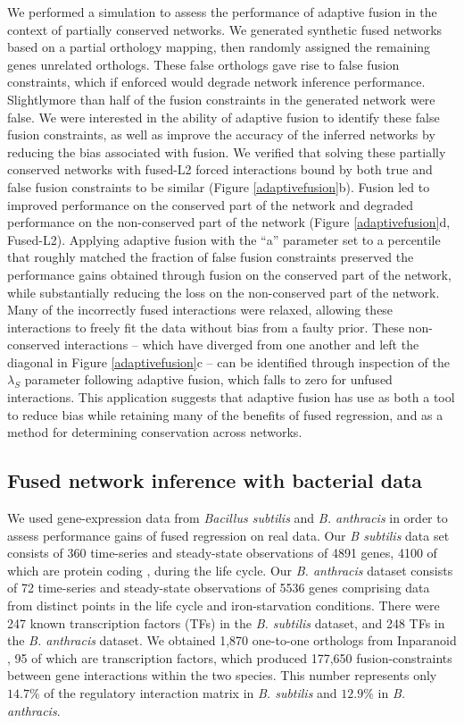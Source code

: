 \documentclass[11pt]{article}
\begin{document}
We performed a simulation to assess the performance of adaptive fusion in the context of partially conserved networks. We generated synthetic fused networks based on a partial orthology mapping, then randomly assigned the remaining genes unrelated orthologs. These false orthologs gave rise to false fusion constraints, which if enforced would degrade network inference performance. Slightlymore than half of the fusion constraints in the generated network were false. We were interested in the ability of adaptive fusion to identify these false fusion constraints, as well as improve the accuracy of the inferred networks by reducing the bias associated with fusion. We verified that solving these partially conserved networks with fused-L2 forced interactions bound by both true and false fusion constraints to be similar (Figure \ref{adaptivefusion}b). Fusion led to improved performance on the conserved part of the network and degraded performance on the non-conserved part of the network (Figure \ref{adaptivefusion}d, Fused-L2). Applying adaptive fusion with the ``a'' parameter set to a percentile that roughly matched the fraction of false fusion constraints preserved the performance gains obtained through fusion on the conserved part of the network, while substantially reducing the loss on the non-conserved part of the network. Many of the incorrectly fused interactions were relaxed, allowing these interactions to freely fit the data without bias from a faulty prior. These non-conserved interactions -- which have diverged from one another and left the diagonal in  Figure \ref{adaptivefusion}c -- can be identified through inspection of the $\lambda_S$ parameter following adaptive fusion, which falls to zero for unfused interactions. This application suggests that adaptive fusion has use as both a tool to reduce bias while retaining many of the benefits of fused regression, and as a method for determining conservation across networks.

\subsection{Fused network inference with bacterial data}
We used gene-expression data from \textit{Bacillus subtilis} and \textit{B. anthracis} in order to assess performance gains of fused regression on real data. 
Our \textit{B subtilis} data set consists of 360 time-series and steady-state observations of 4891 genes, 4100 of which are protein coding \cite{kunst_complete_1997}, during the life cycle.
Our \textit{\textit{B. anthracis}} dataset consists of 72 time-series and steady-state observations of 5536 genes comprising data from distinct points in the life cycle and iron-starvation conditions. 
There were 247 known transcription factors (TFs) in the \textit{\textit{B. subtilis}} dataset, and 248 TFs in the \textit{B. anthracis} dataset.
We obtained 1,870 one-to-one orthologs from Inparanoid \cite{ostlund_inparanoid_2010}, 95 of which are transcription factors, which produced 177,650 fusion-constraints between gene interactions within the two species. 
This number represents only $14.7\%$ of the regulatory interaction matrix in \textit{B. subtilis} and $12.9\%$ in \textit{B. anthracis}. 
\end{document}
